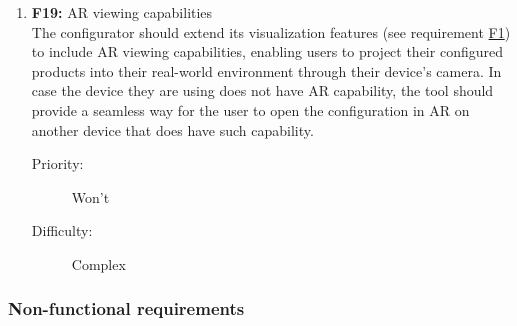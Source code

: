 \begin{enumerate}
\item \textbf{F19:} AR viewing capabilities
\vspace{2pt}
\\The configurator should extend its visualization features (see requirement \hyperref[itm:F1]{F1}) to include AR viewing capabilities, enabling users to project their configured products into their real-world environment through their device's camera. In case the device they are using does not have AR capability, the tool should provide a seamless way for the user to open the configuration in AR on another device that does have such capability.
\begin{description}
    \item[Priority:] Won't
    \item[Difficulty:] Complex
\end{description}
\vspace{4pt}

\end{enumerate}


\subsubsection{Non-functional requirements}

